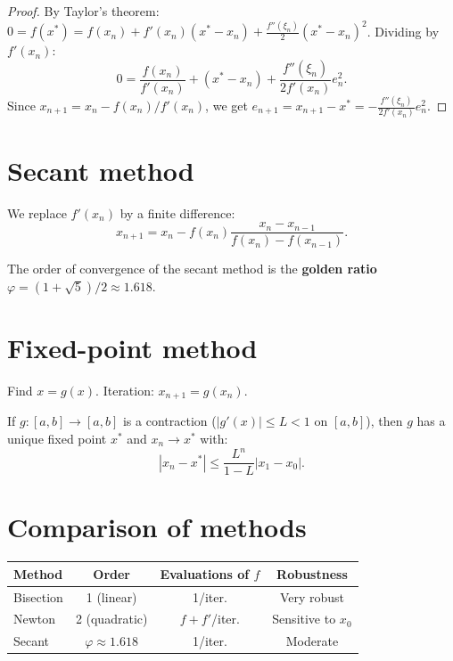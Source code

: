 \begin{proof}
By Taylor's theorem: $0=f(x^*)=f(x_n)+f'(x_n)(x^*-x_n)+\frac{f''(\xi_n)}{2}(x^*-x_n)^2$. Dividing by $f'(x_n)$:
\[
0 = \frac{f(x_n)}{f'(x_n)}+(x^*-x_n)+\frac{f''(\xi_n)}{2f'(x_n)}e_n^2.
\]
Since $x_{n+1}=x_n-f(x_n)/f'(x_n)$, we get $e_{n+1}=x_{n+1}-x^*=-\frac{f''(\xi_n)}{2f'(x_n)}e_n^2$.
\end{proof}

\section{Secant method}

\begin{definition}
We replace $f'(x_n)$ by a finite difference:
\[
x_{n+1} = x_n - f(x_n)\frac{x_n-x_{n-1}}{f(x_n)-f(x_{n-1})}.
\]
\end{definition}

\begin{theorem}
The order of convergence of the secant method is the \textbf{golden ratio} $\varphi=(1+\sqrt{5})/2\approx 1.618$.
\end{theorem}

\section{Fixed-point method}

\begin{definition}
Find $x=g(x)$. Iteration: $x_{n+1}=g(x_n)$.
\end{definition}

\begin{theorem}\label{thm:banach}
If $g:[a,b]\to[a,b]$ is a contraction ($|g'(x)|\leq L<1$ on $[a,b]$), then $g$ has a unique fixed point $x^*$ and $x_n\to x^*$ with:
\[
|x_n-x^*|\leq \frac{L^n}{1-L}|x_1-x_0|.
\]
\end{theorem}

\section{Comparison of methods}

\begin{center}
\begin{tabular}{lccc}
\toprule
\textbf{Method} & \textbf{Order} & \textbf{Evaluations of $f$} & \textbf{Robustness} \\
\midrule
Bisection & 1 (linear) & 1/iter. & Very robust \\
Newton & 2 (quadratic) & $f + f'$/iter. & Sensitive to $x_0$ \\
Secant & $\varphi\approx 1.618$ & 1/iter. & Moderate \\
\bottomrule
\end{tabular}
\end{center}

